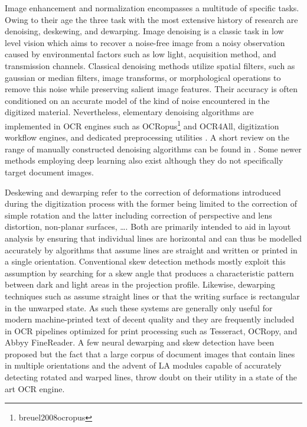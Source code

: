 Image enhancement and normalization encompasses a multitude of specific tasks.
Owing to their age the three task with the most extensive history of research
are denoising, deskewing, and dewarping. Image denoising is a classic task in
low level vision which aims to recover a noise-free image from a noisy
observation caused by environmental factors such as low light, acquisition
method, and transmission channels. Classical denoising methods utilize spatial
filters, such as gaussian or median filters, image transforms, or morphological
operations to remove this noise while preserving salient image features. Their
accuracy is often conditioned on an accurate model of the kind of noise
encountered in the digitized material. Nevertheless, elementary denoising
algorithms are implemented in OCR engines such as
OCRopus\footnote{breuel2008ocropus} and OCR4All\cite{reul2019ocr4all},
digitization workflow engines\cite{neudecker2019ocr}, and dedicated
preprocessing utilities \cite{scantailor}. A short review on the range of
manually constructed denoising algorithms can be found in \cite{fan2019brief}.
Some newer methods employing deep learning also exist
\cite{cha2019fully,laine2019high,soltanayev2018training,chen2018image} although
they do not specifically target document images.

Deskewing and dewarping refer to the correction of deformations introduced
during the digitization process with the former being limited to the correction
of simple rotation and the latter including correction of perspective and lens
distortion, non-planar surfaces, \dots. Both are primarily intended to aid in
layout analysis by ensuring that individual lines are horizontal and can thus
be modelled accurately by algorithms that assume lines are straight and written
or printed in a single orientation. Conventional skew detection methods
\cite{bloomberg1995measuring,amin2000document,papandreou2011novel} mostly
exploit this assumption by searching for a skew angle that produces a
characteristic pattern between dark and light areas in the projection profile.
Likewise, dewarping techniques such as
\cite{zhang2003correcting,ulges2005document,masalovitch2007usage} assume
straight lines or that the writing surface is rectangular
\cite{stamatopoulos2008two} in the unwarped state. As such these systems are
generally only useful for modern machine-printed text of decent quality and
they are frequently included in OCR pipelines optimized for print processing
such as Tesseract, OCRopy, and Abbyy FineReader. A few neural dewarping
\cite{das2019dewarpnet,ma2018docunet} and skew detection \cite{ocropus3} have
been proposed but the fact that a large corpus of document images that contain
lines in multiple orientations and the advent of LA modules capable of
accurately detecting rotated and warped lines, throw doubt on their utility in
a state of the art OCR engine.

